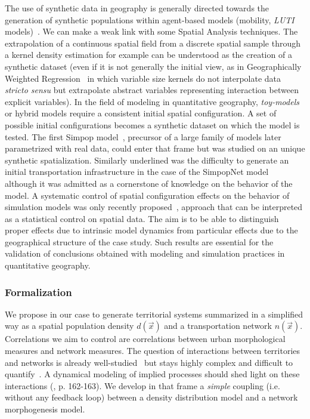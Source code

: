 The use of synthetic data in geography is generally directed towards the generation of synthetic populations within agent-based models (mobility, \emph{LUTI} models)~\cite{pritchard2009advances}. We can make a weak link with some Spatial Analysis techniques. The extrapolation of a continuous spatial field from a discrete spatial sample through a kernel density estimation for example can be understood as the creation of a synthetic dataset (even if it is not generally the initial view, as in Geographically Weighted Regression~\cite{brunsdon1998geographically} in which variable size kernels do not interpolate data \emph{stricto sensu} but extrapolate abstract variables representing interaction between explicit variables). In the field of modeling in quantitative geography, \emph{toy-models} or hybrid models require a consistent initial spatial configuration. A set of possible initial configurations becomes a synthetic dataset on which the model is tested. The first Simpop model~\cite{sanders1997simpop}, precursor of a large family of models later parametrized with real data, could enter that frame but was studied on an unique synthetic spatialization. Similarly underlined was the difficulty to generate an initial transportation infrastructure in the case of the SimpopNet model~\cite{schmitt2014modelisation} although it was admitted as a cornerstone of knowledge on the behavior of the model. A systematic control of spatial configuration effects on the behavior of simulation models was only recently proposed~\cite{cottineau2015revisiting}, approach that can be interpreted as a statistical control on spatial data. The aim is to be able to distinguish proper effects due to intrinsic model dynamics from particular effects due to the geographical structure of the case study. Such results are essential for the validation of conclusions obtained with modeling and simulation practices in quantitative geography.



\subsubsection{Formalization}

We propose in our case to generate territorial systems summarized in a simplified way as a spatial population density $d(\vec{x})$ and a transportation network $n(\vec{x})$. Correlations we aim to control are correlations between urban morphological measures and network measures. The question of interactions between territories and networks is already well-studied~\cite{offner1996reseaux} but stays highly complex and difficult to quantify~\cite{offner1993effets}. A dynamical modeling of implied processes should shed light on these interactions (\cite{bretagnolle:tel-00459720}, p. 162-163). We develop in that frame a \emph{simple} coupling (i.e. without any feedback loop) between a density distribution model and a network morphogenesis model.



